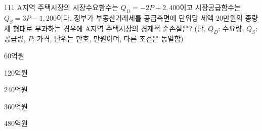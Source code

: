 \begin{question}{111}
A지역 주택시장의 시장수요함수는 $Q_D = -2P + 2{,}400$이고 시장공급함수는 $Q_S = 3P - 1{,}200$이다. 정부가 부동산거래세를 공급측면에 단위당 세액 20만원의 종량세 형태로 부과하는 경우에 A지역 주택시장의 경제적 순손실은? (단, $Q_D$: 수요량, $Q_S$: 공급량, $P$: 가격, 단위는 만호, 만원이며, 다른 조건은 동일함)
\begin{choices}
  \item 60억원
  \item 120억원
  \item 240억원
  \item 360억원
  \item 480억원
\end{choices}
\end{question}
